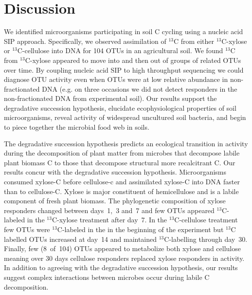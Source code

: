 \section{Discussion} 
We identified microorganisms participating in soil C cycling using a nucleic
acid SIP approach. Specifically, we observed assimilation of $^{13}$C from
either $^{13}$C-xylose or $^{13}$C-cellulose into DNA for 104 OTUs in an 
agricultural soil. We found $^{13}$C from $^{13}$C-xylose appeared to
move into and then out of groups of related OTUs over time. By coupling nucleic
acid SIP to high throughput sequencing we could diagnose OTU activity even when
OTUs were at low relative abundance in non-fractionated DNA (e.g. on three
occasions we did not detect responders in the non-fractionated DNA from
experimental soil). Our results support the degradative succession hypothesis,
elucidate ecophysiological properties of soil microorganisms, reveal activity
of widespread uncultured soil bacteria, and begin to piece together the
microbial food web in soils. 

The degradative succession hypothesis predicts an ecological transition in
activity during the decomposition of plant matter from microbes that decompose
labile plant biomass C to those that decompose structural more recalcitrant C.
Our results concur with the degradative succession hypothesis. Microorganisms
consumed xylose-C before cellulose-c and assimilated xylose-C into DNA faster
than to cellulose-C. Xylose is major constituent of hemicellulose and is
a labile component of fresh plant biomass. The phylogenetic composition of
xylose responders changed between days~1,~3 and~7 and few OTUs appeared
$^{13}$C-labeled in the $^{13}$C-xylose treatment after day~7. In the
$^{13}$C-cellulose treatment few OTUs were $^{13}$C-labeled in the in the
beginning of the experiment but $^{13}$C labelled OTUs increased at day~14 and
maintained $^{13}$C-labelling through day~30. Finally, few (8~of~104) OTUs
appeared to metabolize both xylose and cellulose meaning over 30 days cellulose
responders replaced xylose responders in activity. In
addition to agreeing with the degradative succession hypothesis, our results
suggest complex interactions between microbes occur during labile
C decomposition.

